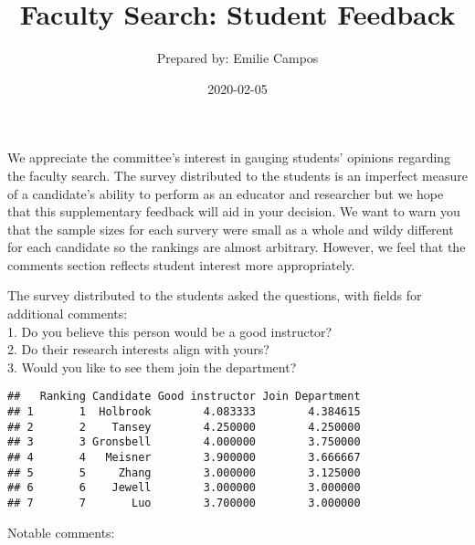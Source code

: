 \documentclass[]{article}
\title{Faculty Search: Student Feedback}
\author{Prepared by: Emilie Campos}
\date{2020-02-05}
\begin{document}
\maketitle

We appreciate the committee's interest in gauging students' opinions
regarding the faculty search. The survey distributed to the students is
an imperfect measure of a candidate's ability to perform as an educator
and researcher but we hope that this supplementary feedback will aid in
your decision. We want to warn you that the sample sizes for each
survery were small as a whole and wildy different for each candidate so
the rankings are almost arbitrary. However, we feel that the comments
section reflects student interest more appropriately.

The survey distributed to the students asked the questions, with fields
for additional comments:\\
1. Do you believe this person would be a good instructor?\\
2. Do their research interests align with yours?\\
3. Would you like to see them join the department?

\begin{verbatim}
##   Ranking Candidate Good instructor Join Department
## 1       1  Holbrook        4.083333        4.384615
## 2       2    Tansey        4.250000        4.250000
## 3       3 Gronsbell        4.000000        3.750000
## 4       4   Meisner        3.900000        3.666667
## 5       5     Zhang        3.000000        3.125000
## 6       6    Jewell        3.000000        3.000000
## 7       7       Luo        3.700000        3.000000
\end{verbatim}

Notable comments:
\end{document}
